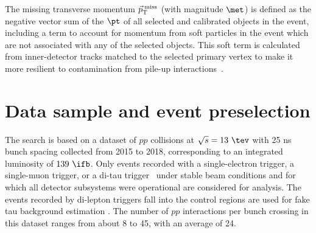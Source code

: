 \documentclass[PAPER, coverpage, atlasdraft=true, texlive=2016, UKenglish]{\ATLASLATEXPATH atlasdoc}
\providecommand{\DIFadd}[1]{{\protect\color{blue}\uwave{#1}}} %
\providecommand{\DIFaddbegin}{} %
\providecommand{\DIFaddend}{} %
\begin{document}

The missing transverse momentum $\vec{p}_\textrm{T}^\textrm{\;miss}$ (with magnitude $\met$) is defined as the negative vector sum of the 
$\pt$ of all selected and calibrated objects in the event, including a term to account for momentum from soft particles 
in the event which are not associated with any of the selected objects. 
This soft term is calculated from inner-detector tracks matched to the selected primary vertex to make it more resilient to
contamination from pile-up interactions~\cite{Aaboud:2018tkc}.




\section{Data sample and event preselection}
\label{sec:data_presel}

The search is based on a dataset of $pp$ collisions at $\sqrt{s}=13~\tev$ with 25 ns bunch spacing collected from 2015 to 2018, corresponding to an integrated luminosity of $139~\ifb$.
Only events recorded with a single-electron trigger, a single-muon trigger, or a di-tau trigger~\cite{TRIG-2018-05,TRIG-2018-01,id_trigger,l1topo_trigger} under stable beam conditions 
and for which all detector subsystems were operational are considered for analysis. The events recorded by di-lepton triggers \DIFaddbegin \DIFadd{that }\DIFaddend fall into the control regions are used for fake tau background
estimation \DIFaddbegin \DIFadd{as discussed in Section~\ref{sec:background_model}}\DIFaddend . The number of $pp$ interactions per bunch crossing in this dataset ranges from about 8 to 45, with an average of 24.
\end{document}
